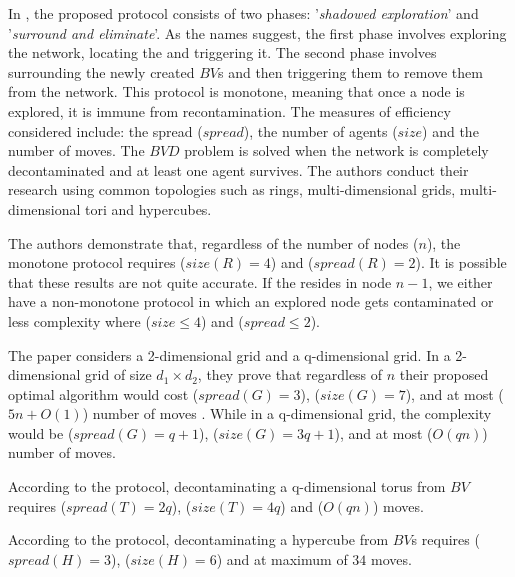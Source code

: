 In \cite{caietal18}, the proposed protocol consists of two phases: '{\em shadowed exploration}' and '{\em surround and eliminate}'. As the names suggest, the first phase involves exploring  the network, locating the \bv and triggering it. The second phase involves surrounding the newly created $BV$s and then triggering them to remove them from the network. This protocol is monotone, meaning that once a node is explored, it is immune from recontamination. The measures of efficiency considered include:  the spread ($spread$), the number of agents ($size$) and the number of moves.
The $BVD$ problem is solved when the network is completely decontaminated and at least one agent survives.
 The authors conduct their research using common topologies such as rings, multi-dimensional grids, multi-dimensional tori and hypercubes.

 The authors demonstrate that, regardless of the number of nodes ($n$), the monotone protocol requires ($size(R)= 4$) and ($spread(R)= 2$). It is possible that these results are not quite accurate. If the  \bv resides in node $n-1$, we either have a non-monotone protocol in which an explored node gets contaminated or  less complexity where ($size\leq 4$) and ($spread \leq 2$).

The paper considers a 2-dimensional grid and a q-dimensional grid. In a 2-dimensional grid of size $d_1\times d_2$, they prove that regardless of $n$ their proposed optimal algorithm would cost ($spread(G)=3$), ($size(G)=7$), and at most ($5n+O(1)$) number of moves . While in a q-dimensional grid, the complexity would be ($spread(G)=q+1$), ($size(G)=3q+1$), and at most ($O(qn)$)  number of moves. 

 According to the protocol, decontaminating a q-dimensional torus from $BV$  requires  ($spread(T)=2q$), ($size(T)=4q$) and  ($O(qn)$) moves.

 According to the protocol, decontaminating a hypercube from $BV$s requires ($spread(H)=3$), ($size(H)=6$) and at maximum of $34$ moves.
 

 









